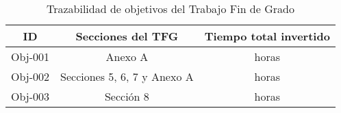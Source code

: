 \begin{table}[H]
    \centering
    \begin{tabular}{|c|c|c|}
    \hline
    \textbf{ID} & \textbf{Secciones del TFG} & \textbf{Tiempo total invertido} \\
    \hline
    Obj-001 & Anexo A & {horas} \\
    \hline
    Obj-002 & Secciones 5, 6, 7 y Anexo A & {horas} \\
    \hline
    Obj-003 & Sección 8 & {horas} \\
    \hline
    \end{tabular}
\caption{Trazabilidad de objetivos del Trabajo Fin de Grado}
\label{tab:trazabilidadTFG}
\end{table}